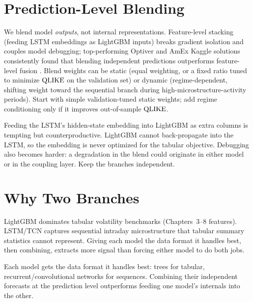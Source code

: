 \section{Prediction-Level Blending}
\label{sec:pred-blend}

We blend model \emph{outputs}, not internal representations.
Feature-level stacking (feeding LSTM embeddings as LightGBM inputs) breaks gradient isolation and couples model debugging; top-performing Optiver and AmEx Kaggle solutions consistently found that blending independent predictions outperforms feature-level fusion \citep{Optiver2021}.
Blend weights can be static (equal weighting, or a fixed ratio tuned to minimize $\operatorname{QLIKE}$ on the validation set) or dynamic (regime-dependent, shifting weight toward the sequential branch during high-microstructure-activity periods).
Start with simple validation-tuned static weights; add regime conditioning only if it improves out-of-sample $\operatorname{QLIKE}$.

\begin{warning}
Feeding the LSTM's hidden-state embedding into LightGBM as extra columns is tempting but counterproductive.
LightGBM cannot back-propagate into the LSTM, so the embedding is never optimized for the tabular objective.
Debugging also becomes harder: a degradation in the blend could originate in either model or in the coupling layer.
Keep the branches independent.
\end{warning}


\section{Why Two Branches}
\label{sec:why-two}

LightGBM dominates tabular volatility benchmarks (Chapters~3--8 features).
LSTM/TCN captures sequential intraday microstructure that tabular summary statistics cannot represent.
Giving each model the data format it handles best, then combining, extracts more signal than forcing either model to do both jobs.


\begin{keyidea}
Each model gets the data format it handles best: trees for tabular, recurrent/convolutional networks for sequences.
Combining their independent forecasts at the prediction level outperforms feeding one model's internals into the other.
\end{keyidea}
